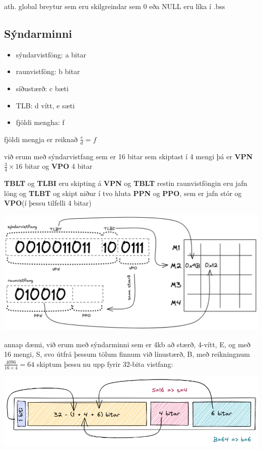 \documentclass{article}
\begin{document}
ath. global breytur sem eru skilgreindar sem 0 eða NULL eru líka í .bss
\newpage

\subsection{Sýndarminni}
\begin{itemize}
    \item sýndarvistföng: a bitar
    \item raunvistföng: b bitar
    \item síðustærð: c bæti
    \item TLB: d vítt, e sæti
    \item fjöldi mengha: f
\end{itemize}

fjöldi mengja er reiknað $\frac{e}{d} = f$

við erum með sýndarvistfang sem er 16 bitar sem skiptast í 4 mengi
þá er \textbf{VPN}$\frac{3}{4} \times 16$ bitar og \textbf{VPO} 4 bitar

\textbf{TBLT} og \textbf{TLBI} eru skipting á \textbf{VPN} og \textbf{TBLT} restin raunvistföngin eru jafn löng og \textbf{TLBT} og skipt niður í tvo hluta \textbf{PPN} og \textbf{PPO}, sem er jafn stór og \textbf{VPO}(í þessu tilfelli 4 bitar)

\includegraphics[scale = 0.2]{myndir/syndarminni.excalidraw.png}

annap dæmi, við erum með sýndarminni sem er 4kb að stærð, 4-vítt, E, og með 16 mengi, S, svo útfrá þessum tölum finnum við línustærð, B, með reikningnum $\frac{4096}{16 \times 4} = 64$ skiptum þessu nu upp fyrir 32-bita vistfang:

\includegraphics[scale = 0.3]{myndir/skipting.excalidraw.png}
\end{document}
